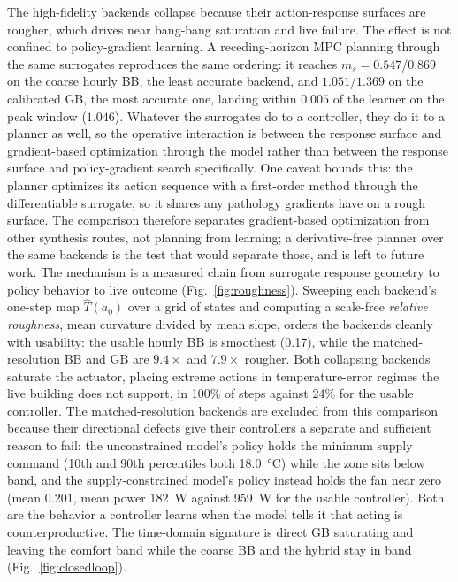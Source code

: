 \documentclass{ieeeaccess}
\newcommand{\ms}{\ensuremath{m_s}}
\begin{document}
The high-fidelity backends collapse because their action-response surfaces are rougher, which drives
near bang-bang saturation and live failure. The effect is not confined to policy-gradient learning.
A receding-horizon MPC planning through the same surrogates reproduces the same ordering: it reaches
$\ms=0.547$/$0.869$ on the coarse hourly BB, the least accurate backend, and $1.051$/$1.369$ on the
calibrated GB, the most accurate one, landing within $0.005$ of the learner on the peak window
($1.046$). Whatever the surrogates do to a controller, they do it to a planner as well, so the
operative interaction is between the response surface and gradient-based optimization through the
model rather than between the response surface and policy-gradient search specifically. One caveat
bounds this: the planner optimizes its action sequence with a first-order method through the
differentiable surrogate, so it shares any pathology gradients have on a rough surface. The
comparison therefore separates gradient-based optimization from other synthesis routes, not planning
from learning; a derivative-free planner over the same backends is the test that would separate
those, and is left to future work. The mechanism is a measured chain from surrogate
response geometry to policy behavior to live outcome (Fig.~\ref{fig:roughness}). Sweeping each
backend's one-step map $\widehat{T}(a_0)$ over a grid of states and computing a scale-free
\emph{relative roughness}, mean curvature divided by mean slope, orders the backends cleanly with
usability: the usable hourly BB is smoothest (0.17), while the matched-resolution BB and GB are
$9.4\times$ and $7.9\times$ rougher. Both collapsing backends saturate the actuator, placing extreme
actions in temperature-error regimes the live building does not support, in 100\% of steps against
24\% for the usable controller. The matched-resolution backends are excluded from this comparison because their
directional defects give their controllers a separate and sufficient reason to fail: the
unconstrained model's policy holds the minimum supply command (10th and 90th percentiles both
\SI{18.0}{\celsius}) while the zone sits below band, and the supply-constrained model's policy
instead holds the fan near zero (mean \num{0.201}, mean power \SI{182}{\watt} against
\SI{959}{\watt} for the usable controller). Both are the behavior a controller learns when the
model tells it that acting is counterproductive. The time-domain signature is direct GB saturating and leaving the
comfort band while the coarse BB and the hybrid stay in band (Fig.~\ref{fig:closedloop}).
\end{document}

